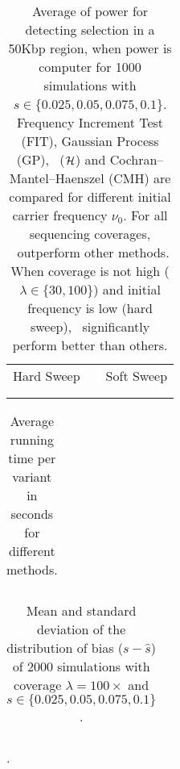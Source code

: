 \begin{table}[h]
	\centering
	\begin{tabular}{ccc}
		Hard Sweep & &Soft Sweep\\ \\  
		
		&&
	\end{tabular}
        \caption{Average of power for detecting selection in a 50Kbp region, 
        when power is computer for 1000 simulations with 
        $s\in\{0.025,0.05,0.075,0.1\}$. Frequency Increment 
        Test (FIT), Gaussian Process (GP), \comale\ (${\cal H}$) and 
        Cochran–Mantel–Haenszel (CMH) are compared for different initial 
        carrier frequency $\nu_0$. For all sequencing coverages, \comale\ 
        outperform other methods. When coverage is not high 
        ($\lambda\in\{30,100\}$) and initial frequency is low (hard sweep), 
        \comale\ significantly perform better than others.}
\label{tab:power}
\end{table}


\begin{table}[h]
	\centering
	\begin{tabular}{c}
		
	\end{tabular}
	\caption{Average running time per variant in seconds for different 
	methods.}\label{tab:times}
\end{table}

\begin{table}[h]
	\centering
	\begin{tabular}{c}
		
	\end{tabular}
	\caption{Mean and standard deviation of the distribution of bias 
	($s-\hat{s}$) of 2000 simulations with coverage $\lambda=100\times$ and 
	$s\in\{0.025,0.05,0.075,0.1\}$.}\label{tab:biasdist}
\end{table}


\begin{table}[h]
	\centering
	\begin{tabular}{c}
		
	\end{tabular}
	\caption{.}\label{tab:stats}
\end{table}